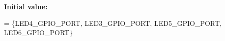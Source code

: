 {\bfseries Initial value\-:}
\begin{DoxyCode}
= \{LED4\_GPIO\_PORT, 
                                 LED3\_GPIO\_PORT, 
                                 LED5\_GPIO\_PORT,
                                 LED6\_GPIO\_PORT\}
\end{DoxyCode}
